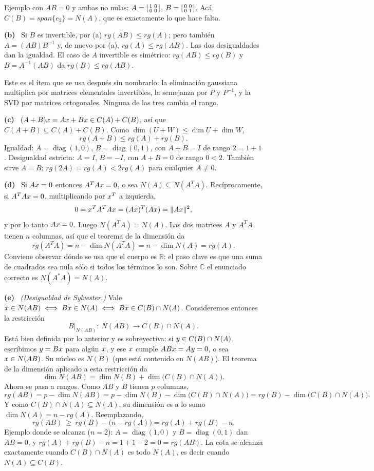\documentclass[11pt,a4paper]{article}
\newcommand{\bi}[1]{\boldsymbol{#1}}
\newcommand{\n}[1]{\boldsymbol{#1}}
\newcommand{\R}{\mathbb{R}}
\newcommand{\Cx}{\mathbb{C}}
\DeclareMathOperator{\gen}{span}
\DeclareMathOperator{\tr}{tr}
\DeclareMathOperator{\rg}{rg}
\DeclareMathOperator{\diag}{diag}
\def\n#1{#1}\def\bi#1{#1}\def\rg{rg}\def\tr{tr}\def\gen{span}%
\newcommand{\itemsol}[1]{\par\medskip\noindent\textbf{(#1)}\ \ignorespaces}
\begin{document}
Ejemplo con $AB=0$ y ambas no nulas:
$A=\begin{bsmallmatrix}1&0\\0&0\end{bsmallmatrix}$,
$B=\begin{bsmallmatrix}0&0\\0&1\end{bsmallmatrix}$. Acá
$C(B)=\gen\{\bi{e}_2\}=N(A)$, que es exactamente lo que hace falta.

\itemsol{b} Si $B$ es invertible, por (a) $\rg(AB)\le\rg(A)$; pero también
$A=(AB)B^{-1}$ y, de nuevo por (a), $\rg(A)\le\rg(AB)$. Las dos desigualdades
dan la igualdad. El caso de $A$ invertible es simétrico: $\rg(AB)\le\rg(B)$ y
$B=A^{-1}(AB)$ da $\rg(B)\le\rg(AB)$.

Este es el ítem que se usa después sin nombrarlo: la eliminación gaussiana
multiplica por matrices elementales invertibles, la semejanza por $P$ y
$P^{-1}$, y la SVD por matrices ortogonales. Ninguna de las tres cambia el
rango.

\itemsol{c} $(A+B)\bx=A\bx+B\bx\in C(A)+C(B)$, así que
$C(A+B)\subseteq C(A)+C(B)$. Como $\dim(U+W)\le\dim U+\dim W$,
\[
\rg(A+B)\le\rg(A)+\rg(B).
\]
Igualdad: $A=\diag(1,0)$, $B=\diag(0,1)$, con $A+B=I$ de rango $2=1+1$.
Desigualdad estricta: $A=I$, $B=-I$, con $A+B=0$ de rango $0<2$. También sirve
$A=B$: $\rg(2A)=\rg(A)<2\rg(A)$ para cualquier $A\neq0$.

\itemsol{d} Si $A\bx=\n0$ entonces $A^TA\bx=\n0$, o sea
$N(A)\subseteq N(A^TA)$. Recíprocamente, si $A^TA\bx=\n0$, multiplicando por
$\bx^T$ a izquierda,
\[
0=\bx^TA^TA\bx=(A\bx)^T(A\bx)=\|A\bx\|^2 ,
\]
y por lo tanto $A\bx=\n0$. Luego $N(A^TA)=N(A)$. Las dos matrices $A$ y $A^TA$
tienen $n$ columnas, así que el teorema de la dimensión da
\[
\rg(A^TA)=n-\dim N(A^TA)=n-\dim N(A)=\rg(A).
\]
Conviene observar dónde se usa que el cuerpo es $\R$: el paso clave es que una
suma de cuadrados sea nula sólo si todos los términos lo son. Sobre $\Cx$ el
enunciado correcto es $N(A^*A)=N(A)$.

\itemsol{e} \emph{(Desigualdad de Sylvester.)} Vale
$\bx\in N(AB)\iff B\bx\in N(A)\iff B\bx\in C(B)\cap N(A)$. Consideremos
entonces la restricción
\[
B\big|_{N(AB)}:\ N(AB)\longrightarrow C(B)\cap N(A).
\]
Está bien definida por lo anterior y es sobreyectiva: si
$\by\in C(B)\cap N(A)$, escribimos $\by=B\bx$ para algún $\bx$, y ese $\bx$
cumple $AB\bx=A\by=\n0$, o sea $\bx\in N(AB)$. Su núcleo es $N(B)$ (que está
contenido en $N(AB)$). El teorema de la dimensión aplicado a esta restricción
da
\[
\dim N(AB)=\dim N(B)+\dim\big(C(B)\cap N(A)\big).
\]
Ahora se pasa a rangos. Como $AB$ y $B$ tienen $p$ columnas,
\[
\rg(AB)=p-\dim N(AB)=p-\dim N(B)-\dim\big(C(B)\cap N(A)\big)
      =\rg(B)-\dim\big(C(B)\cap N(A)\big).
\]
Y como $C(B)\cap N(A)\subseteq N(A)$, su dimensión es a lo sumo
$\dim N(A)=n-\rg(A)$. Reemplazando,
\[
\rg(AB)\ \ge\ \rg(B)-\big(n-\rg(A)\big)=\rg(A)+\rg(B)-n .
\]
Ejemplo donde se alcanza ($n=2$): $A=\diag(1,0)$ y $B=\diag(0,1)$ dan $AB=0$, y
$\rg(A)+\rg(B)-n=1+1-2=0=\rg(AB)$. La cota se alcanza exactamente cuando
$C(B)\cap N(A)$ es todo $N(A)$, es decir cuando $N(A)\subseteq C(B)$.
\end{document}
